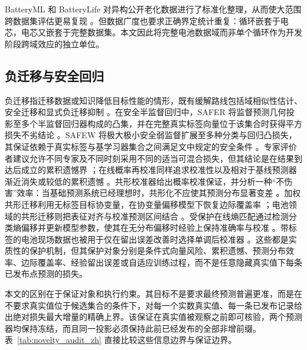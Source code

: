\documentclass[UTF8,11pt]{ctexart}
\begin{document}
BatteryML 和 BatteryLife 对异构公开老化数据进行了标准化整理，从而使大范围跨数据集评估更易复现 \citep{zhang2024batteryml,tan2025batterylife}。但数据广度也要求正确界定统计重复：循环嵌套于电芯，电芯又嵌套于完整数据集。本文因此将完整电池数据域而非单个循环作为开发阶段跨域效应的独立单位。

\subsection{负迁移与安全回归}

负迁移指迁移数据或知识降低目标性能的情形，既有缓解路线包括域相似性估计、安全迁移和显式负迁移抑制 \citep{zhang2023negative}。在安全半监督回归中，SAFER 将监督预测几何投影至多个半监督回归器构成的凸集，并在完整真实标签向量位于该集合时获得平方损失不劣结论 \citep{li2017safer}。SAFEW 将极大极小安全弱监督扩展至多种分类与回归凸损失，其保证依赖于真实标签与基学习器集合之间满足文中规定的安全条件 \citep{li2021safeweak}。专家评价者建议允许不同专家及不同时刻采用不同的适当可混合损失，但其结论是在结果到达后成立的累积遗憾界 \citep{chernov2009evaluators}；在线概率再校准同样追求校准性以及相对于基线预测器渐近消失或较低的累积遗憾 \citep{marx2025calibrated,deshpande2025calibrated}。共形校准器给出概率校准保证，并分析一种“不伤害”效率：当基础预测系统已经理想时，共形化不应使其预测分布显著变差 \citep{vovk2020conformal}。加权共形迁移利用无标签目标协变量，在协变量偏移模型下恢复边际覆盖率 \citep{tuwani2023transport}；电池领域的共形迁移则把表征对齐与校准预测区间结合 \citep{filgueira2026conformalized}。受保护在线熵匹配通过检测分类熵偏移并更新模型参数，使其在无分布偏移时经验上保持准确率与校准 \citep{bar2024protected}。带标签的电池现场数据也被用于仅在留出误差改善时选择单调后校准器 \citep{nyachionjeka2026safecalibrated}。这些都是实质性的保护机制，但其保护对象分别是条件式向量风险、累积遗憾、预测分布效率、边际覆盖率、经验留出误差或自适应训练过程，而不是任意隐藏真实值下每条已发布点预测的损失。

本文的区别在于保证对象和执行约束。其目标不是要求最终预测普遍更准，而是在不要求真实值位于候选集合的条件下，对每一个实数真实值、每一条已发布记录给出绝对损失最大增量的精确上界。该保证在真实值被观察之前即可核验，两个预测器均保持冻结，而且同一投影必须保持此前已经发布的全部非增前缀。表~\ref{tab:novelty_audit_zh} 直接比较这些信息边界与保证边界。
\end{document}
